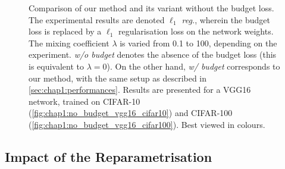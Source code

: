\begin{figure}
  \centering
  \caption{ Comparison of our method and its variant without the budget loss.
    The experimental results are denoted \emph{$\ell_1$ reg.}, wherein the budget
    loss is replaced by a $\ell_1$ regularisation loss on the network weights. The
    mixing coefficient $\lambda$ is varied from 0.1 to 100, depending on the
    experiment. \emph{w/o budget} denotes the absence of the budget loss (this
    is equivalent to $\lambda = 0$). On the other hand, \emph{w/ budget}
    corresponds to our method, with the same setup as described in
    \cref{sec:chap1:performances}. Results are presented for a VGG16 network,
    trained on CIFAR-10 (\cref{fig:chap1:no_budget_vgg16_cifar10}) and CIFAR-100
    (\cref{fig:chap1:no_budget_vgg16_cifar100}). Best viewed in colours.}
  \label{fig:chap1:no_budget_vgg16}
\end{figure}



\subsection{Impact of the Reparametrisation}
\label{sec:chap1:impact_of_reparametrisation}

